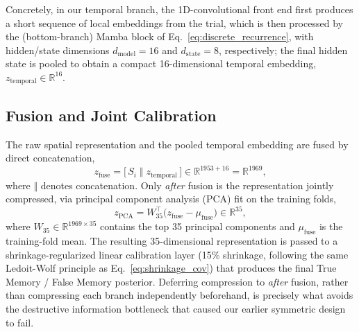 \documentclass[journal]{IEEEtran}
\begin{document}
Concretely, in our temporal branch, the 1D-convolutional front end first produces a short sequence of local embeddings from the trial, which is then processed by the (bottom-branch) Mamba block of Eq.~\eqref{eq:discrete_recurrence}, with hidden/state dimensions $d_{\mathrm{model}}=16$ and $d_{\mathrm{state}}=8$, respectively; the final hidden state is pooled to obtain a compact 16-dimensional temporal embedding, $z_{\mathrm{temporal}} \in \mathbb{R}^{16}$.

\subsection{Fusion and Joint Calibration}
\label{sec:calibration}
The raw spatial representation and the pooled temporal embedding are fused by direct concatenation,
\begin{equation}
z_{\mathrm{fuse}} = \big[\, S_i \;\Vert\; z_{\mathrm{temporal}} \,\big] \in \mathbb{R}^{1953+16} = \mathbb{R}^{1969},
\label{eq:fusion}
\end{equation}
where $\Vert$ denotes concatenation. Only \emph{after} fusion is the representation jointly compressed, via principal component analysis (PCA) \cite{jolliffe2002principal} fit on the training folds,
\begin{equation}
z_{\mathrm{PCA}} = W_{35}^{\top}\big(z_{\mathrm{fuse}} - \mu_{\mathrm{fuse}}\big) \in \mathbb{R}^{35},
\label{eq:pca}
\end{equation}
where $W_{35} \in \mathbb{R}^{1969 \times 35}$ contains the top 35 principal components and $\mu_{\mathrm{fuse}}$ is the training-fold mean. The resulting 35-dimensional representation is passed to a shrinkage-regularized linear calibration layer (15\% shrinkage, following the same Ledoit-Wolf principle as Eq.~\eqref{eq:shrinkage_cov}) that produces the final True Memory / False Memory posterior. Deferring compression to \emph{after} fusion, rather than compressing each branch independently beforehand, is precisely what avoids the destructive information bottleneck that caused our earlier symmetric design to fail.
\end{document}

